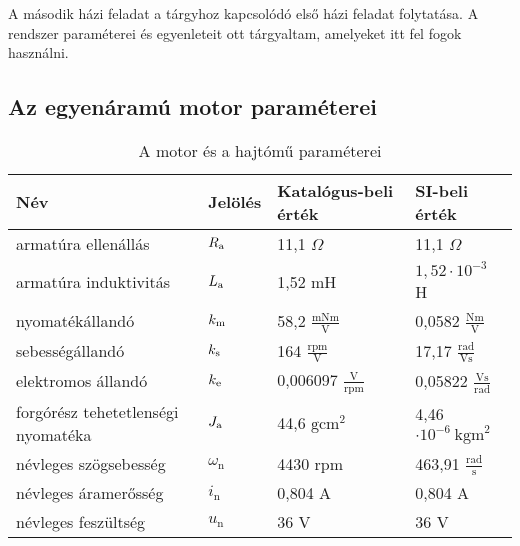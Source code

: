 \clearpage


A második házi feladat a tárgyhoz kapcsolódó első házi feladat folytatása.
A rendszer paraméterei és egyenleteit ott tárgyaltam, amelyeket itt fel fogok használni.

\subsection*{Az egyenáramú motor paraméterei}

\begin{table}[H]
\begin{tabular}{llll}\toprule
Név                                & Jelölés           & Katalógus-beli érték                    & SI-beli érték                           \\ \midrule
armatúra ellenállás                & $R_\text{a}$             & 11,1 $\Omega$                           & 11,1 $\Omega$                           \\
armatúra induktivitás              & $L_\text{a}$             & 1,52 mH                                 & $1,52\cdot10^{-3}$ H                    \\
nyomatékállandó                    & $k_\text{m}$             & 58,2 $\frac{\text{mNm}}{\text{V}}$      & 0,0582 $\frac{\text{Nm}}{\text{V}}$     \\
sebességállandó                    & $k_\text{s}$             & 164 $\frac{\text{rpm}}{\text{V}}$       & 17,17 $\frac{\text{rad}}{\text{Vs}}$    \\
elektromos állandó                 & $k_\text{e}$             & 0,006097  $\frac{\text{V}}{\text{rpm}}$ & 0,05822 $\frac{\text{Vs}}{\text{rad}}$  \\
forgórész tehetetlenségi nyomatéka & $J_\text{a}$             & 44,6 $\text{gcm}^2$                     & 4,46$\cdot10^{-6}~\text{kgm}^2$         \\
névleges szögsebesség              & $\omega_\text{n}$ & 4430 rpm                                & 463,91 $\frac{\text{rad}}{\text{s}}$    \\
névleges áramerősség               & $i_\text{n}$      & 0,804 A                                 & 0,804 A                                 \\
névleges feszültség                & $u_\text{n}$      & 36 V                                    & 36 V                                    \\ \bottomrule
\end{tabular}
\caption{A motor és a hajtómű paraméterei}
\end{table}

